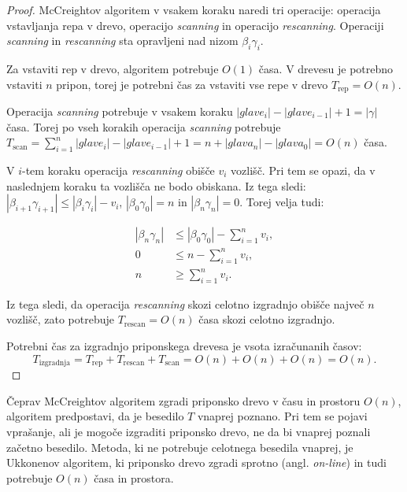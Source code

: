 \begin{proof}
    McCreightov algoritem v vsakem koraku naredi tri operacije: operacija vstavljanja repa v drevo, operacijo \textit{scanning} in operacijo \textit{rescanning}. Operaciji  \textit{scanning} in \textit{rescanning} sta opravljeni nad nizom $\beta_i\gamma_i$. 
    
    Za vstaviti rep v drevo, algoritem potrebuje $O(1)$ časa. V drevesu je potrebno vstaviti $n$ pripon, torej je potrebni čas za vstaviti vse repe v drevo $T_{\text{rep}}=O(n)$.

    Operacija \textit{scanning} potrebuje v vsakem koraku $|glave_i|-|glave_{i-1}|+1=|\gamma|$ časa. Torej po vseh korakih operacija \textit{scanning}  potrebuje $T_{\text{scan}}=\sum_{i=1}^n |glave_i|-|glave_{i-1}|+1= n + |glava_n|-|glava_0|=O(n)$ časa.

    V $i$-tem koraku operacija \textit{rescanning} obišče $v_i$ vozlišč. Pri tem se opazi, da v naslednjem koraku ta vozlišča ne bodo obiskana. Iz tega sledi:  $|\beta_{i+1}\gamma_{i+1}|\le|\beta_i\gamma_i|-v_i$, $|\beta_0\gamma_0|=n$ in $|\beta_n\gamma_n|=0$. Torej velja tudi:
    
    \begin{equation*} 
        \begin{split}
        |\beta_n\gamma_n|&\le|\beta_0\gamma_0|- \sum_{i=1}^n v_i,\\
        0&\le n- \sum_{i=1}^n v_i,\\
        n&\ge \sum_{i=1}^n v_i.
        \end{split}
    \end{equation*}
    
    Iz tega sledi, da operacija \textit{rescanning} skozi celotno izgradnjo obišče največ $n$ vozlišč, zato potrebuje $T_{\text{rescan}}=O(n)$ časa skozi celotno izgradnjo.
    
    Potrebni čas za izgradnjo priponskega drevesa je vsota izračunanih časov: 
    $$T_{\text{izgradnja}}=T_{\text{rep}}+T_{\text{rescan}}+T_{\text{scan}}=O(n)+O(n)+O(n)=O(n).$$
\end{proof}

Čeprav McCreightov algoritem zgradi priponsko drevo v času in prostoru $O(n)$, algoritem predpostavi, da je besedilo $T$ vnaprej poznano. Pri tem se pojavi vprašanje, ali je mogoče izgraditi priponsko drevo, ne da bi vnaprej poznali začetno besedilo. Metoda, ki ne potrebuje celotnega besedila vnaprej, je Ukkonenov algoritem, ki priponsko drevo zgradi sprotno (angl. \textit{on-line}) in tudi potrebuje $O(n)$ časa in prostora.

